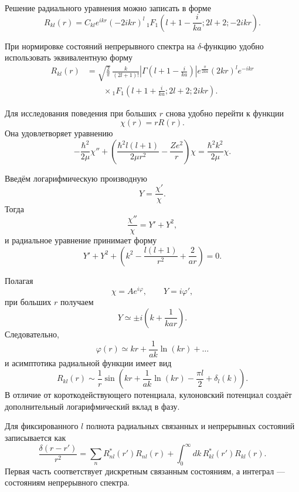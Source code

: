 \documentclass[12pt,a4paper]{article}
\begin{document}
Решение радиального уравнения можно записать в форме
\[
    \boxed{
    R_{kl}(r)
    =
    C_{kl}
    e^{ikr}
    (-2ikr)^l\,
    {}_1F_1
    \left(
        l+1-\frac{i}{ka};
        2l+2;
        -2ikr
    \right)
    }.
\]

При нормировке состояний непрерывного спектра на $\delta$-функцию
удобно использовать эквивалентную форму
\[
\boxed{
\begin{aligned}
    R_{kl}(r)
    &=
    \sqrt{\frac{2}{\pi}}\,
    \frac{k}{(2l+1)!}
    \left|
        \Gamma
        \left(
            l+1-\frac{i}{ka}
        \right)
    \right|
    e^{\frac{\pi}{2ka}}
    (2kr)^l e^{-ikr}
    \\
    &\qquad\times
    {}_1F_1
    \left(
        l+1+\frac{i}{ka};
        2l+2;
        2ikr
    \right).
\end{aligned}
}
\]

Для исследования поведения при больших $r$ снова удобно перейти к
функции
\[
    \chi(r)=rR(r).
\]
Она удовлетворяет уравнению
\[
    -\frac{\hbar^2}{2\mu}\chi''
    +
    \left(
        \frac{\hbar^2l(l+1)}{2\mu r^2}
        -
        \frac{Ze^2}{r}
    \right)\chi
    =
    \frac{\hbar^2k^2}{2\mu}\chi.
\]

Введём логарифмическую производную
\[
    Y=\frac{\chi'}{\chi}.
\]
Тогда
\[
    \frac{\chi''}{\chi}=Y'+Y^2,
\]
и радиальное уравнение принимает форму
\[
    \boxed{
    Y'+Y^2
    +
    \left(
        k^2
        -
        \frac{l(l+1)}{r^2}
        +
        \frac{2}{ar}
    \right)
    =
    0
    }.
\]

Полагая
\[
    \chi=Ae^{i\varphi},
    \qquad
    Y=i\varphi',
\]
при больших $r$ получаем
\[
    Y
    \simeq
    \pm i
    \left(
        k+\frac{1}{kar}
    \right).
\]
Следовательно,
\[
    \varphi(r)
    \simeq
    kr+\frac{1}{ak}\ln(kr)+\ldots
\]
и асимптотика радиальной функции имеет вид
\[
    \boxed{
    R_{kl}(r)
    \sim
    \frac{1}{r}
    \sin
    \left(
        kr
        +
        \frac{1}{ak}\ln(kr)
        -
        \frac{\pi l}{2}
        +
        \delta_l(k)
    \right)
    }.
\]
В отличие от короткодействующего потенциала, кулоновский потенциал
создаёт дополнительный логарифмический вклад в фазу.

Для фиксированного $l$ полнота радиальных связанных и непрерывных
состояний записывается как
\[
    \boxed{
    \frac{\delta(r-r')}{r^2}
    =
    \sum_n
        R_{nl}^*(r')R_{nl}(r)
    +
    \int_0^\infty
        dk\,
        R_{kl}^*(r')R_{kl}(r)
    }.
\]
Первая часть соответствует дискретным связанным состояниям, а интеграл
--- состояниям непрерывного спектра.
\end{document}
